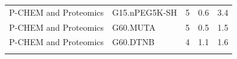 \documentclass[utf8]{frontiersHLTH} %
\begin{document}
\begin{longtable}[]{@{}lllll@{}}
\begin{minipage}[t]{0.26\columnwidth}\raggedright\strut
P-CHEM and Proteomics\strut
\end{minipage} & \begin{minipage}[t]{0.21\columnwidth}\raggedright\strut
G15.nPEG5K-SH\strut
\end{minipage} & \begin{minipage}[t]{0.06\columnwidth}\raggedright\strut
5\strut
\end{minipage} & \begin{minipage}[t]{0.15\columnwidth}\raggedright\strut
0.6\strut
\end{minipage} & \begin{minipage}[t]{0.08\columnwidth}\raggedright\strut
3.4\strut
\end{minipage}\tabularnewline
\begin{minipage}[t]{0.26\columnwidth}\raggedright\strut
P-CHEM and Proteomics\strut
\end{minipage} & \begin{minipage}[t]{0.21\columnwidth}\raggedright\strut
G60.MUTA\strut
\end{minipage} & \begin{minipage}[t]{0.06\columnwidth}\raggedright\strut
5\strut
\end{minipage} & \begin{minipage}[t]{0.15\columnwidth}\raggedright\strut
0.5\strut
\end{minipage} & \begin{minipage}[t]{0.08\columnwidth}\raggedright\strut
1.5\strut
\end{minipage}\tabularnewline
\begin{minipage}[t]{0.26\columnwidth}\raggedright\strut
P-CHEM and Proteomics\strut
\end{minipage} & \begin{minipage}[t]{0.21\columnwidth}\raggedright\strut
G60.DTNB\strut
\end{minipage} & \begin{minipage}[t]{0.06\columnwidth}\raggedright\strut
4\strut
\end{minipage} & \begin{minipage}[t]{0.15\columnwidth}\raggedright\strut
1.1\strut
\end{minipage} & \begin{minipage}[t]{0.08\columnwidth}\raggedright\strut
1.6\strut
\end{minipage}\tabularnewline
\begin{minipage}[t]{0.26\columnwidth}\raggedright\strut

\end{minipage}
\end{longtable}
\end{document}
